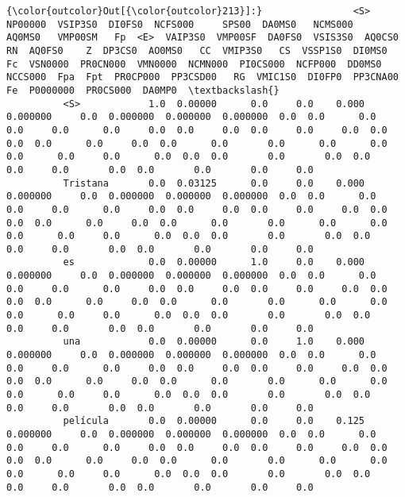 \documentclass[11pt]{article}
\begin{document}
\begin{Verbatim}[commandchars=\\\{\}]
{\color{outcolor}Out[{\color{outcolor}213}]:}                <S>  NP00000  VSIP3S0  DI0FS0  NCFS000     SPS00  DA0MS0   NCMS000    AQ0MS0   VMP00SM   Fp  <E>  VAIP3S0  VMP00SF  DA0FS0  VSIS3S0  AQ0CS0   RN  AQ0FS0    Z  DP3CS0  AO0MS0   CC  VMIP3S0   CS  VSSP1S0  DI0MS0   Fc  VSN0000  PR0CN000  VMN0000  NCMN000  PI0CS000  NCFP000  DD0MS0  NCCS000  Fpa  Fpt  PR0CP000  PP3CSD00   RG  VMIC1S0  DI0FP0  PP3CNA00   Fe  P0000000  PR0CS000  DA0MP0  \textbackslash{}
          <S>            1.0  0.00000      0.0     0.0    0.000  0.000000     0.0  0.000000  0.000000  0.000000  0.0  0.0      0.0      0.0     0.0      0.0     0.0  0.0     0.0  0.0     0.0     0.0  0.0      0.0  0.0      0.0     0.0  0.0      0.0       0.0      0.0      0.0       0.0      0.0     0.0      0.0  0.0  0.0       0.0       0.0  0.0      0.0     0.0       0.0  0.0       0.0       0.0     0.0   
          Tristana       0.0  0.03125      0.0     0.0    0.000  0.000000     0.0  0.000000  0.000000  0.000000  0.0  0.0      0.0      0.0     0.0      0.0     0.0  0.0     0.0  0.0     0.0     0.0  0.0      0.0  0.0      0.0     0.0  0.0      0.0       0.0      0.0      0.0       0.0      0.0     0.0      0.0  0.0  0.0       0.0       0.0  0.0      0.0     0.0       0.0  0.0       0.0       0.0     0.0   
          es             0.0  0.00000      1.0     0.0    0.000  0.000000     0.0  0.000000  0.000000  0.000000  0.0  0.0      0.0      0.0     0.0      0.0     0.0  0.0     0.0  0.0     0.0     0.0  0.0      0.0  0.0      0.0     0.0  0.0      0.0       0.0      0.0      0.0       0.0      0.0     0.0      0.0  0.0  0.0       0.0       0.0  0.0      0.0     0.0       0.0  0.0       0.0       0.0     0.0   
          una            0.0  0.00000      0.0     1.0    0.000  0.000000     0.0  0.000000  0.000000  0.000000  0.0  0.0      0.0      0.0     0.0      0.0     0.0  0.0     0.0  0.0     0.0     0.0  0.0      0.0  0.0      0.0     0.0  0.0      0.0       0.0      0.0      0.0       0.0      0.0     0.0      0.0  0.0  0.0       0.0       0.0  0.0      0.0     0.0       0.0  0.0       0.0       0.0     0.0   
          película       0.0  0.00000      0.0     0.0    0.125  0.000000     0.0  0.000000  0.000000  0.000000  0.0  0.0      0.0      0.0     0.0      0.0     0.0  0.0     0.0  0.0     0.0     0.0  0.0      0.0  0.0      0.0     0.0  0.0      0.0       0.0      0.0      0.0       0.0      0.0     0.0      0.0  0.0  0.0       0.0       0.0  0.0      0.0     0.0       0.0  0.0       0.0       0.0     0.0   

\end{Verbatim}
\end{document}
